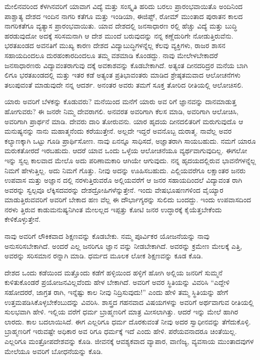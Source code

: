 ಮೇಲಿನವರಿಂದ ಕೆಳಗಿನವರಿಗೆ ಯಾವಾಗ ವಿದ್ಯೆ ಮತ್ತು ಸಂಸ್ಕೃತಿ ಹರಿದು ಬರಲು ಪ್ರಾರಂಭವಾಯಿತೊ ಅಂದಿನಿಂದ ಪಾಶ್ಚಾತ್ಯ ದೇಶದ ಇಂದಿನ ನಾಗರಿ ಕತೆಗೂ ಮತ್ತು ಇಂಡಿಯಾ, ಈಜಿಪ್ಟ್, ರೋಮ್ ಮುಂತಾದ ಪುರಾತನ ಕಾಲದ ನಾಗರಿಕತೆಗೂ ವ್ಯತ್ಯಾಸ ಪ್ರಾರಂಭವಾಯಿತು. ಯಾವ ದೇಶದಲ್ಲಿ ಜನಸಾಧಾರಣ ರಲ್ಲಿ ಹೆಚ್ಚು ವಿದ್ಯೆ ಮತ್ತು ಬುದ್ಧಿ ಹರಡುವುದೋ ಅದಕ್ಕೆ ಸರಿಸಮನಾಗಿ ಆ ದೇಶ ಮುಂದೆ ಬರುವುದನ್ನು ನನ್ನ ಕಣ್ಣೆದುರಿಗೇ ನೋಡುತ್ತಿರುವೆನು. ಭರತಖಂಡದ ಅವನತಿಗೆ ಮುಖ್ಯ ಕಾರಣ ದೇಶದ ವಿದ್ಯಾಬುದ್ಧಿಗಳನ್ನೆಲ್ಲ ಕೆಲವು ವ್ಯಕ್ತಿಗಳು, ರಾಜರ ಶಾಸನ ಸಹಾಯದಿಂದಲೂ ದುರಹಂಕಾರದಿಂದಲೂ ತಮ್ಮ ವಶಮಾಡಿ ಕೊಂಡದ್ದು. ನಾವು ಮೇಲೇಳಬೇಕಾದರೆ ಜನಸಾಧಾರಣರು ವಿದ್ಯಾವಂತರಾಗುವು ದಕ್ಕೆ ಅವಕಾಶವನ್ನು ಕೊಡಬೇಕಾಗಿದೆ. ಅತ್ಯಂತ ದೀನದರಿದ್ರರ ಮನೆಯ ಬಾಗಿ ಲಿಗೂ ಭರತಖಂಡದಲ್ಲಿ ಮತ್ತು ಇತರ ಕಡೆ ಅತ್ಯಂತ ಪ್ರತಿಭಾವಂತರು ಮಾಡಿದ ಶ್ರೇಷ್ಠತಮವಾದ ಆಲೋಚನೆಗಳು ತಲುಪುವಂತೆ ಮಾಡುವುದೇ ನನ್ನ ಆದರ್ಶ. ಅನಂತರ ಅವರು ತಮಗೆ ಸೂಕ್ತ ತೋರಿದ ರೀತಿಯಲ್ಲಿ ಆಲೋಚಿಸಲಿ.

ಯಾರು ಅವರಿಗೆ ಬೆಳಕನ್ನು ಕೊಡುವರು? ಮನೆಯಿಂದ ಮನೆಗೆ ಯಾರು ಅವ ರಿಗೆ ಜ್ಞಾನವನ್ನು ದಾನಮಾಡುತ್ತ ಹೋಗುವರು? ಈ ಜನರೇ ನಿಮ್ಮ ದೇವರಾಗಲಿ. ಅನವರತ ಅವರಿಗಾಗಿ ಕೆಲಸ ಮಾಡಿ, ಅವರಿಗಾಗಿ ಆಲೋಚಿಸಿ, ಅವರಿಗಾಗಿ ಪ್ರಾರ್ಥನೆ ಮಾಡಿ. ದೇವರು ದಾರಿ ತೋರುವನು. ಯಾರ ಹೃದಯ ದೀನದಲಿತರಿಗೆ ಮರುಗುವುದೊ ಆ ಮನುಷ್ಯನನ್ನು ನಾನು ಮಹಾತ್ಮನೆಂದು ಕರೆಯುತ್ತೇನೆ. ಅಲ್ಲದೇ ಇದ್ದರೆ ಅವನೊಬ್ಬ ದುರಾತ್ಮ. ನಾವೆಲ್ಲ ಅವರ ಕಲ್ಯಾಣಕ್ಕಾಗಿ ಒಟ್ಟು ಗೂಡಿ ಪ್ರಾರ್ಥಿಸೋಣ. ನಾವು ಏನನ್ನೂ ಸಾಧಿಸದೆ, ಅಜ್ಞಾತರಾಗಿ ಸಾಯಬಹುದು. ನಮಗೆ ಯಾರೂ ಮರುಕತೋರದೆ ಇರಬಹುದು. ಆದರೆ ಯಾವ ಒಂದು ಒಳ್ಳೆಯ ಆಲೋಚನೆಯೂ ವ್ಯರ್ಥವಾಗುವುದಿಲ್ಲ. ಈಗಲೋ ಇನ್ನು ಸ್ವಲ್ಪ ಕಾಲವಾದ ಮೇಲೊ ಅದು ಪರಿಣಾಮಕಾರಿ ಆಗಿಯೇ ಆಗುವುದು. ನನ್ನ ಹೃದಯದಲ್ಲಿರುವ ಭಾವನೆಗಳನ್ನೆಲ್ಲ ನಿಮಗೆ ಹೇಳುತ್ತಿಲ್ಲ. ಅದು ನಿಮಗೆ ಗೊತ್ತು. ನೀವು ಅದನ್ನು ಊಹಿಸಬಹುದು. ಎಲ್ಲಿಯವರೆಗೂ ಲಕ್ಷಾಂತರ ಜನರು ಉಪವಾಸ ಮತ್ತು ಅಜ್ಞಾನ ದಲ್ಲಿ ನರಳುತ್ತಿರುವರೊ ಅಲ್ಲಿಯವರೆಗೆ ಆ ಜನರ ಸಹಾಯದಿಂದಲೆ ವಿದ್ಯಾವಂತ ರಾಗಿ ಅವರನ್ನು ಸ್ವಲ್ಪವೂ ಲೆಕ್ಕಿಸದವರನ್ನು ದೇಶದ್ರೋಹಿಗಳೆನ್ನುತ್ತೇನೆ. ಇಂದು ವೇಷಭೂಷಣಗಳಿಂದ ವೈಯ್ಯಾರ ಮಾಡುತ್ತಿರುವವರಿಗೆ ಅವರಿಗೆ ಬೇಕಾದ ಹಣ ವೆಲ್ಲ ಈ ದೌರ್ಭಾಗ್ಯರನ್ನು ಸುಲಿದು ಬಂದದ್ದು. ಇಂದು ಉಪವಾಸದಿಂದ ನರಳು ತ್ತಿರುವ ಕಾಡುಮನುಷ್ಯನಿಗಿಂತ ಮೇಲಲ್ಲದ ಇಪ್ಪತ್ತು ಕೋಟಿ ಜನರ ಉದ್ಧಾರಕ್ಕೆ ಕೈಯೆತ್ತಬೇಕೆಂದು ಕೇಳಿಕೊಳ್ಳುತ್ತೇನೆ.

ನಾವು ಅವರಿಗೆ ಲೌಕಿಕವಾದ ಶಿಕ್ಷಣವನ್ನು ಕೊಡಬೇಕು. ನಮ್ಮ ಪೂರ್ವಿಕರ ಯೋಜನೆಯನ್ನು ನಾವು ಅನುಸರಿಸಬೇಕಾಗಿದೆ. ಅಂದರೆ ಎಲ್ಲ ಜನರಿಗೂ ಜ್ಞಾನ ವನ್ನು ನೀಡಬೇಕಾಗಿದೆ. ಅವರನ್ನು ಕ್ರಮೇಣ ಮೇಲಕ್ಕೆ ಎತ್ತಿ, ಅವರನ್ನು ಸರಿಸಮಾನ ರನ್ನಾಗಿ ಮಾಡಿ. ಧರ್ಮದ ಮೂಲಕ ಲೋಕ ಶಿಕ್ಷಣವನ್ನು ಕೂಡ ಕೊಡಿ.

ದೇಶದ ಒಂದು ಕಡೆಯಿಂದ ಮತ್ತೊಂದು ಕಡೆಗೆ ಹಳ್ಳಿಯಿಂದ ಹಳ್ಳಿಗೆ ಹೋಗಿ ಅಲ್ಲಿಯ ಜನರಿಗೆ ಸುಮ್ಮನೆ ಕುಳಿತುಕೊಂಡರೆ ಪ್ರಯೋಜನವಿಲ್ಲವೆಂದು ಹೇಳ ಬೇಕಾಗಿದೆ. ಅವರಿಗೆ ಅವರ ಸ್ಥಿತಿಯನ್ನು ವಿವರಿಸಿ “ಎದ್ದೇಳಿ ಸಹೋದರರೆ, ಜಾಗ್ರತ ರಾಗಿ, ಇನ್ನೆಷ್ಟು ಕಾಲ ನೀವು ನಿದ್ರಿಸುವುದು!” ಎಂದು ಹೇಳಿ ತಮ್ಮ ಸ್ಥಿತಿಯನ್ನು ಹೇಗೆ ಉತ್ತಮಪಡಿಸಿಕೊಳ್ಳಬೇಕೆಂಬುದನ್ನು ವಿವರಿಸಿ. ಶಾಸ್ತ್ರದ ಗಹನವಾದ ವಿಷಯಗಳನ್ನು ಅವರಿಗೆ ಅರ್ಥವಾಗುವ ರೀತಿಯಲ್ಲಿ ಸುಲಭವಾಗಿ ಹೇಳಿ. ಇಲ್ಲಿಯ ವರೆಗೆ ಧರ್ಮ ಬ್ರಾಹ್ಮಣರಿಗೆ ಮಾತ್ರ ಮೀಸಲಾಗಿತ್ತು. ಆದರೆ ಇನ್ನು ಮೇಲೆ ಹಾಗಿರ ಲಾರದು. ಕಾಲ ಬದಲಾಯಿಸಿದೆ. ಈಗ ಎಲ್ಲರಿಗೂ ಧರ್ಮ ದೊರಕುವಂತೆ ನೀವು ಅದರ ಸ್ವಾಧೀನವನ್ನು ತೆಗೆದುಕೊಳ್ಳಿ. ಬ್ರಾಹ್ಮಣರಿಗೆ ಇರುವಷ್ಟೇ ಅಧಿಕಾರ ಅವ ರಿಗೂ ಧರ್ಮಕ್ಕೆ ಇದೆ ಎಂದು ಹೇಳಿ. ಪರೆಯವನಾದರೂ ಚಿಂತೆಯಿಲ್ಲ. ಎಲ್ಲರಿಗೂ ಮಂತ್ರೋಪದೇಶವನ್ನು ಕೊಡಿ. ಜೀವನಕ್ಕೆ ಆವಶ್ಯಕವಾದ ವ್ಯಾಪಾರ, ವಾಣಿಜ್ಯ, ವ್ಯವಸಾಯ ಮುಂತಾದವುಗಳ ಮೇಲೆಯೂ ಅವರಿಗೆ ಬೋಧನೆಯನ್ನು ಕೊಡಿ.

